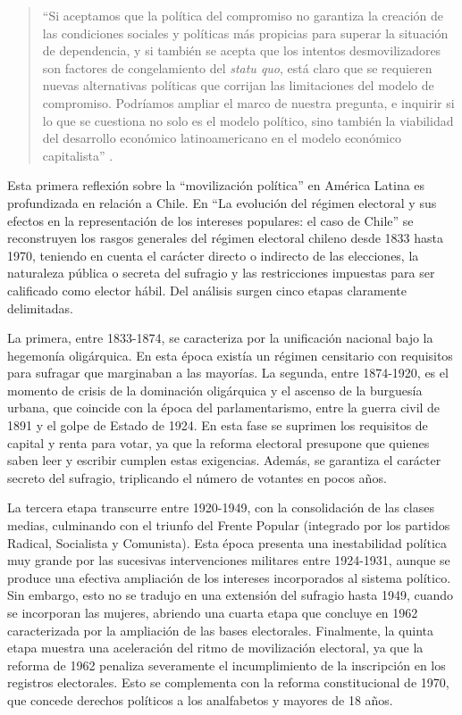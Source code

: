 {\begin{quote}
\enquote{Si aceptamos que la política del compromiso no garantiza la creación de las condiciones sociales y políticas más propicias para superar la situación de dependencia, y si también se acepta que los intentos desmovilizadores son factores de congelamiento del \emph{statu quo}, está claro que se requieren nuevas alternativas políticas que corrijan las limitaciones del modelo de compromiso. Podríamos ampliar el marco de nuestra pregunta, e inquirir si lo que se cuestiona no solo es el modelo político, sino también la viabilidad del desarrollo económico latinoamericano en el modelo económico capitalista} \parencite[119]{1569-BORON2020}.
\end{quote}

Esta primera reflexión sobre la \enquote{movilización política} en América Latina es profundizada en relación a Chile. En \enquote{La evolución del régimen electoral y sus efectos en la representación de los intereses populares: el caso de Chile} \parencite{1570-BORON1971} se reconstruyen los rasgos generales del régimen electoral chileno desde 1833 hasta 1970, teniendo en cuenta el carácter directo o indirecto de las elecciones, la naturaleza pública o secreta del sufragio y las restricciones impuestas para ser calificado como elector hábil. Del análisis surgen cinco etapas claramente delimitadas.

La primera, entre 1833-1874, se caracteriza por la unificación nacional bajo la hegemonía oligárquica. En esta época existía un régimen censitario con requisitos para sufragar que marginaban a las mayorías. La segunda, entre 1874-1920, es el momento de crisis de la dominación oligárquica y el ascenso de la burguesía urbana, que coincide con la época del parlamentarismo, entre la guerra civil de 1891 y el golpe de Estado de 1924. En esta fase se suprimen los requisitos de capital y renta para votar, ya que la reforma electoral presupone que quienes saben leer y escribir cumplen estas exigencias. Además, se garantiza el carácter secreto del sufragio, triplicando el número de votantes en pocos años.

La tercera etapa transcurre entre 1920-1949, con la consolidación de las clases medias, culminando con el triunfo del Frente Popular (integrado por los partidos Radical, Socialista y Comunista). Esta época presenta una inestabilidad política muy grande por las sucesivas intervenciones militares entre 1924-1931, aunque se produce una efectiva ampliación de los intereses incorporados al sistema político. Sin embargo, esto no se tradujo en una extensión del sufragio hasta 1949, cuando se incorporan las mujeres, abriendo una cuarta etapa que concluye en 1962 caracterizada por la ampliación de las bases electorales. Finalmente, la quinta etapa muestra una aceleración del ritmo de movilización electoral, ya que la reforma de 1962 penaliza severamente el incumplimiento de la inscripción en los registros electorales. Esto se complementa con la reforma constitucional de 1970, que concede derechos políticos a los analfabetos y mayores de 18 años.

}
